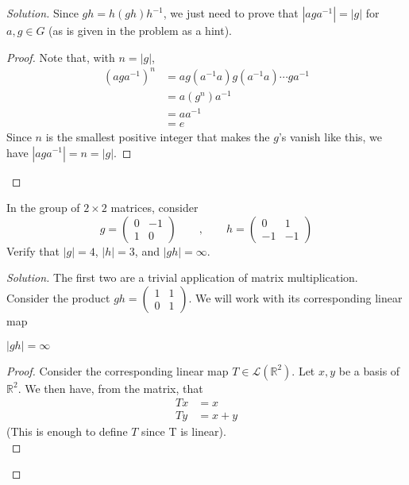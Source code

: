 \documentclass[12pt]{article}
\newenvironment{problem}[2][Problem]{\begin{trivlist}
\item[\hskip \labelsep {\bfseries #1}\hskip \labelsep {\bfseries #2.}]}{\end{trivlist}}
\newenvironment{proposition}[1][Proposition]{\begin{trivlist}
\item[\hskip \labelsep {\bfseries #1.}]}{\end{trivlist}}
\newenvironment{solution}
  {\renewcommand\qedsymbol{$\blacksquare$}\begin{proof}[Solution]}
{\end{proof}}
\newenvironment{sproof}{
  \renewcommand\qedsymbol{$\square$}
  \begin{proof}
  }{
  \end{proof}
}
\begin{document}
\begin{solution}
  Since $gh = h(gh)h^{-1}$, we just need to prove that $|aga^{-1}|=|g|$
  for $a,g\in G$ (as is given in the problem as a hint).
  \begin{sproof}
    Note that, with $n=|g|$,
    \begin{align*}
      (aga^{-1})^n &= ag(a^{-1}a)g(a^{-1}a)\cdots ga^{-1} \\
      &= a(g^n)a^{-1} \\
      &= aa^{-1} \\
      &= e
    \end{align*}
    Since $n$ is the smallest positive integer that makes the $g$'s 
    vanish like this, we have $|aga^{-1}| = n = |g|$. 
  \end{sproof}
\end{solution}
\begin{problem}{1.12}
  In the group of $2\times 2$ matrices, consider
  \begin{equation*}
     g = \begin{pmatrix} 0 & -1\\ 1 & 0 \end{pmatrix} \qquad, \qquad
     h = \begin{pmatrix} 0 & 1\\ -1 & -1 \end{pmatrix} 
  \end{equation*}
  Verify that $|g|=4$, $|h|=3$, and $|gh|=\infty$.
  \begin{solution}
    The first two are a trivial application of matrix multiplication.\\
    Consider the product 
    $gh = \begin{pmatrix}1&1\\0&1\end{pmatrix}$. We will work with its
    corresponding linear map \\
    \begin{proposition}
      $|gh| = \infty$
    \end{proposition}
    \begin{proof}
      Consider the corresponding linear map $T \in \mathcal{L}(\mathbb{R}^2)$.
      Let ${x,y}$ be a basis of $\mathbb{R}^2$. We then have, from the matrix,
      that
      \begin{align*}
        Tx &= x \\
        Ty &= x + y
      \end{align*}
      (This is enough to define $T$ since T is linear).\\

\end{proof}
\end{solution}
\end{problem}
\end{document}
